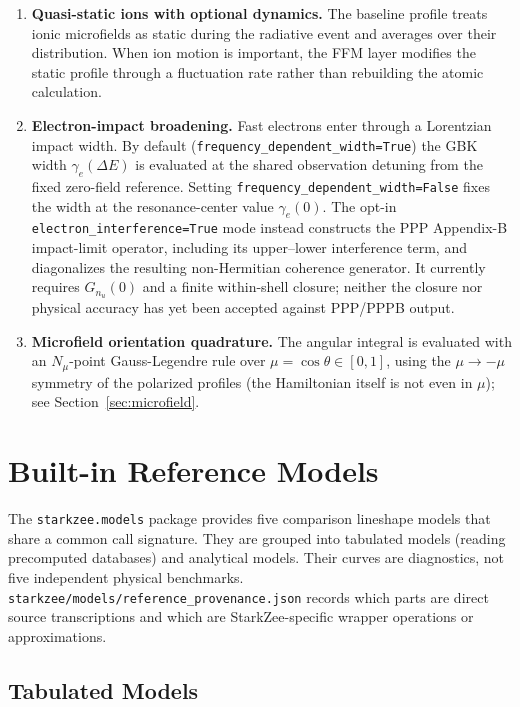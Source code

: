 \documentclass[11pt,a4paper]{article}
\numberwithin{equation}{section}
\begin{document}
\begin{enumerate}
    \item \textbf{Quasi-static ions with optional dynamics.}
    The baseline profile treats ionic microfields as static during the radiative event and averages over their distribution.  When ion motion is important, the FFM layer modifies the static profile through a fluctuation rate rather than rebuilding the atomic calculation.

    \item \textbf{Electron-impact broadening.}
    Fast electrons enter through a Lorentzian impact width.  By default (\texttt{frequency\_de\-pendent\_width=True}) the GBK width $\gamma_e(\Delta E)$ is evaluated at the shared observation detuning from the fixed zero-field reference.  Setting \texttt{frequency\_de\-pendent\_width=False} fixes the width at the resonance-center value $\gamma_e(0)$. The opt-in \texttt{electron\_\allowbreak interference=True} mode instead constructs the PPP Appendix-B impact-limit operator, including its upper--lower interference term, and diagonalizes the resulting non-Hermitian coherence generator. It currently requires $G_{n_u}(0)$ and a finite within-shell closure; neither the closure nor physical accuracy has yet been accepted against PPP/PPPB output.

    \item \textbf{Microfield orientation quadrature.}
    The angular integral is evaluated with an $N_\mu$-point Gauss-Legendre rule over $\mu = \cos\theta \in [0,1]$, using the $\mu\to-\mu$ symmetry of the polarized profiles (the Hamiltonian itself is not even in $\mu$); see Section~\ref{sec:microfield}.
\end{enumerate}

\section{Built-in Reference Models}
\label{sec:models}

The \texttt{starkzee.models} package provides five comparison lineshape models that share a common call signature. They are grouped into tabulated models (reading precomputed databases) and analytical models. Their curves are diagnostics, not five independent physical benchmarks. \texttt{starkzee/models/reference\_provenance.json} records which parts are direct source transcriptions and which are StarkZee-specific wrapper operations or approximations.

\subsection{Tabulated Models}
\end{document}

